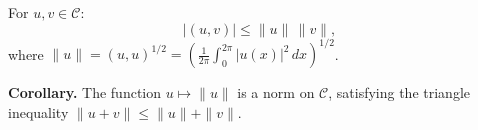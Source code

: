 For $u, v \in \mathcal{C}$:
\[
|(u, v)| \leq \|u\| \, \|v\|,
\]
where $\|u\| = (u, u)^{1/2} = \left(\frac{1}{2\pi} \int_0^{2\pi} |u(x)|^2 \, dx\right)^{1/2}$.

\textbf{Corollary.} The function $u \mapsto \|u\|$ is a norm on $\mathcal{C}$, satisfying the triangle inequality $\|u + v\| \leq \|u\| + \|v\|$.
